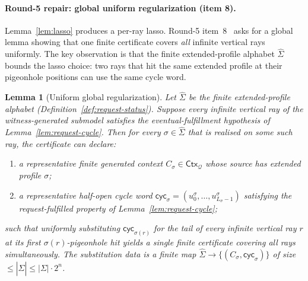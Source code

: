 \documentclass[11pt]{article}
\newtheorem{lemma}[theorem]{Lemma}
\newcommand{\Q}{\mathcal Q}
\newcommand{\Ctx}{\mathsf{Ctx}}
\newcommand{\extSigma}{\widehat\Sigma}
\begin{document}
\paragraph{Round-5 repair: global uniform regularization (item 8).}
Lemma~\ref{lem:lasso} produces a per-ray lasso.  Round-5
item~8~\cite{GPT55Round5Review} asks for a global lemma showing
that one finite certificate covers \emph{all} infinite vertical
rays uniformly.  The key observation is that the finite
extended-profile alphabet $\extSigma$ bounds the lasso choice:
two rays that hit the same extended profile at their pigeonhole
positions can use the same cycle word.

\begin{lemma}[Uniform global regularization]\label{lem:global-rep}
Let $\extSigma$ be the finite extended-profile alphabet
(Definition~\ref{def:request-status}).  Suppose every infinite
vertical ray of the witness-generated submodel satisfies the
eventual-fulfillment hypothesis of
Lemma~\ref{lem:request-cycle}.  Then for every
$\sigma\in\extSigma$ that is realised on some such ray, the
certificate can declare:
\begin{enumerate}[label=(\arabic*)]
\item a representative finite generated context $C_\sigma\in
  \Ctx_\Q$ whose source has extended profile $\sigma$;
\item a representative half-open cycle word
  $\mathsf{cyc}_\sigma=(u_0^\sigma,\ldots,u_{L_\sigma-1}^\sigma)$
  satisfying the request-fulfilled property of
  Lemma~\ref{lem:request-cycle};
\end{enumerate}
such that uniformly substituting $\mathsf{cyc}_{\sigma(r)}$ for the
tail of every infinite vertical ray $r$ at its first
$\sigma(r)$-pigeonhole hit yields a single finite certificate
covering all rays simultaneously.  The substitution data is a finite
map $\extSigma\to\{(C_\sigma,\mathsf{cyc}_\sigma)\}$ of size
$\le|\extSigma|\le|\Sigma|\cdot 2^n$.
\end{lemma}
\end{document}
